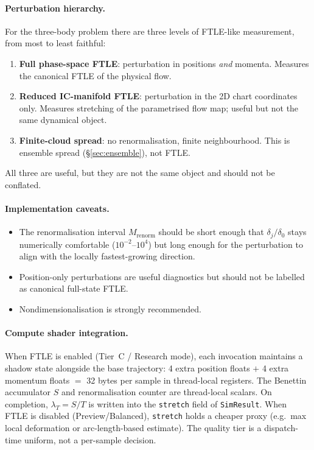 \documentclass[11pt]{report}
\begin{document}
\paragraph{Perturbation hierarchy.} For the three-body problem there are three levels of FTLE-like measurement, from most to least faithful:
\begin{enumerate}[nosep]
\item \textbf{Full phase-space FTLE}: perturbation in positions \emph{and} momenta. Measures the canonical FTLE of the physical flow.
\item \textbf{Reduced IC-manifold FTLE}: perturbation in the 2D chart coordinates only. Measures stretching of the parametrised flow map; useful but not the same dynamical object.
\item \textbf{Finite-cloud spread}: no renormalisation, finite neighbourhood. This is ensemble spread (\S\ref{sec:ensemble}), not FTLE.
\end{enumerate}
All three are useful, but they are not the same object and should not be conflated.

\paragraph{Implementation caveats.}
\begin{itemize}[nosep]
\item The renormalisation interval $M_{\mathrm{renorm}}$ should be short enough that $\delta_j/\delta_0$ stays numerically comfortable ($10^{-2}$--$10^{4}$) but long enough for the perturbation to align with the locally fastest-growing direction.
\item Position-only perturbations are useful diagnostics but should not be labelled as canonical full-state FTLE.
\item Nondimensionalisation is strongly recommended.
\end{itemize}

\paragraph{Compute shader integration.} When FTLE is enabled (Tier~C / Research mode), each invocation maintains a shadow state alongside the base trajectory: 4 extra position floats $+$ 4 extra momentum floats $=$ 32 bytes per sample in thread-local registers. The Benettin accumulator $S$ and renormalisation counter are thread-local scalars. On completion, $\lambda_T=S/T$ is written into the \texttt{stretch} field of \texttt{SimResult}. When FTLE is disabled (Preview/Balanced), \texttt{stretch} holds a cheaper proxy (e.g.\ max local deformation or arc-length-based estimate). The quality tier is a dispatch-time uniform, not a per-sample decision.
\end{document}
